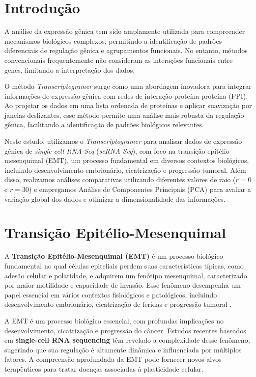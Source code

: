 \documentclass[12pt]{article}
\begin{document}
\newpage

\section{Introdução}

A análise da expressão gênica tem sido amplamente utilizada para compreender mecanismos biológicos complexos, permitindo a identificação de padrões diferenciais de regulação gênica e agrupamentos funcionais. No entanto, métodos convencionais frequentemente não consideram as interações funcionais entre genes, limitando a interpretação dos dados.

O método \textit{Transcriptogramer} surge como uma abordagem inovadora para integrar informações de expressão gênica com redes de interação proteína-proteína (PPI). Ao projetar os dados em uma lista ordenada de proteínas e aplicar suavização por janelas deslizantes, esse método permite uma análise mais robusta da regulação gênica, facilitando a identificação de padrões biológicos relevantes.

Neste estudo, utilizamos o \textit{Transcriptogramer} para analisar dados de expressão gênica de \textit{single-cell RNA-Seq} (\textit{scRNA-Seq}), com foco na transição epitélio-mesenquimal (EMT), um processo fundamental em diversos contextos biológicos, incluindo desenvolvimento embrionário, cicatrização e progressão tumoral. Além disso, realizamos análises comparativas utilizando diferentes valores de raio ($r = 0$ e $r = 30$) e empregamos Análise de Componentes Principais (PCA) para avaliar a variação global dos dados e otimizar a dimensionalidade das informações.

\section{Transição Epitélio-Mesenquimal}

A \textbf{Transição Epitélio-Mesenquimal (EMT)} é um processo biológico fundamental no qual células epiteliais perdem suas características típicas, como adesão celular e polaridade, e adquirem um fenótipo mesenquimal, caracterizado por maior motilidade e capacidade de invasão. Esse fenômeno desempenha um papel essencial em vários contextos fisiológicos e patológicos, incluindo desenvolvimento embrionário, cicatrização de feridas e progressão tumoral \cite{dongre}.



A EMT é um processo biológico essencial, com profundas implicações no desenvolvimento, cicatrização e progressão do câncer. Estudos recentes baseados em \textbf{single-cell RNA sequencing} têm revelado a complexidade desse fenômeno, sugerindo que sua regulação é altamente dinâmica e influenciada por múltiplos fatores. A compreensão aprofundada da EMT pode fornecer novos alvos terapêuticos para tratar doenças associadas à plasticidade celular.
\end{document}

